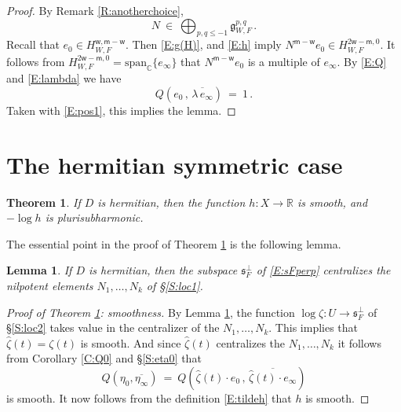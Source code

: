 \documentclass[12pt]{amsart}
\numberwithin{equation}{section}
\numberwithin{table}{section}
\def\z{\zeta}
\def\bC{\mathbb{C}}
\def\fg{\mathfrak{g}}
\def\sfm{\mathsf{m}}
\def\bR{\mathbb{R}}
\def\tspan{\mathrm{span}}
\def\sfw{\mathsf{w}}
\newtheorem{lemma}[equation]{Lemma}
\newtheorem{theorem}[equation]{Theorem}
\theoremstyle{definition}
\theoremstyle{definition}
\theoremstyle{remark}
\def\fs{\mathfrak{s}}
\begin{document}
\begin{proof}
By Remark \ref{R:anotherchoice}, 
\[
  N \ \in \ \bigoplus_{p,q\le-1} \fg^{p,q}_{W,F} \,.
\]
Recall that $e_0 \in H^{\sfw,\sfm-\sfw}_{W,F}$.  Then \eqref{E:g(H)}, and \eqref{E:h} imply $N^{\sfm-\sfw} e_0 \in H^{2\sfw-\sfm,0}_{W,F}$.  It follows from $H^{2\sfw-\sfm,0}_{W,F} = \tspan_\bC\{e_\infty\}$ that $N^{\sfm-\sfw} e_0$ is a multiple of $e_\infty$.  By \eqref{E:Q} and \eqref{E:lambda} we have
\begin{equation} \nonumber %
  Q( e_0 \,,\, \overline{\lambda\,e_\infty} ) \ = \ 1 \,.
\end{equation}
Taken with \eqref{E:pos1}, this implies the lemma.
\end{proof}


\section{The hermitian symmetric case} \label{S:herm}


\begin{theorem} \label{T:herm}
If $D$ is hermitian, then the function $h : X \to \bR$ is smooth, and $-\log h$ is plurisubharmonic.
\end{theorem}

The essential point in the proof of Theorem \ref{T:herm} is the following lemma. 

\begin{lemma} \label{L:herm}
If $D$ is hermitian, then the subspace $\fs_F^\perp$ of \eqref{E:sFperp} centralizes the nilpotent elements $N_1,\ldots,N_k$ of \S\ref{S:loc1}.
\end{lemma}

\begin{proof}[Proof of Theorem \ref{T:herm}: smoothness]
By Lemma \ref{L:herm}, the function $\log \z : U \to \fs_F^\perp$ of \S\ref{S:loc2} takes value in the centralizer of the $N_1,\ldots,N_k$.  This implies that $\hat\z(t) = \z(t)$ is smooth.  And since $\hat\z(t)$ centralizes the $N_1,\ldots,N_k$ it follows from Corollary \ref{C:Q0} and \S\ref{S:eta0} that 
\begin{equation}\label{E:Qherm}
  Q(\eta_0,\overline{\eta_\infty}) \ = \ 
  Q \left( \hat\z(t)\cdot e_0 \,,\,
  \overline{\hat\z(t)\cdot e_\infty} \right)
\end{equation}
is smooth.  It now follows from the definition \eqref{E:tildeh} that $h$ is smooth.
\end{proof}
\end{document}
